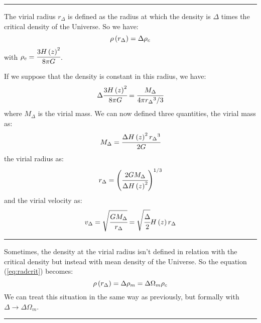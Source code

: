 \noindent\rule{\linewidth}{1pt}
The virial radius $r_\Delta$ is defined as the radius at which the density is $\Delta$ times the critical density of the Universe.
So we have:
\begin{equation}\label{eq:radcrit}
	\rho\left({r_\Delta}\right)=\Delta\rho_c
\end{equation}
with $\rho_c=\cfrac{3H\left({z}\right)^2}{8\pi{G}}$.

If we suppose that the density is constant in this radius, we have:
\begin{equation}
	\Delta\cfrac{3H\left({z}\right)^2}{8\pi{G}}=\cfrac{M_\Delta}{4\pi{r_\Delta}^3/3}
\end{equation}
where $M_\Delta$ is the virial mass.
We can now defined three quantities, the virial mass as:
\begin{equation}
	M_\Delta=\cfrac{\Delta{H\left({z}\right)^2{r_\Delta}^3}}{2G}
\end{equation}
the virial radius as:
\begin{equation}
	r_\Delta=\left(\cfrac{2 G M_\Delta}{\Delta{H\left({z}\right)^2}}\right)^{1/3}
\end{equation}
and the virial velocity as:
\begin{equation}
	v_\Delta=\sqrt{\cfrac{G M_\Delta}{r_\Delta}}=\sqrt{\cfrac{\Delta}{2}} H\left({z}\right){r_\Delta}
\end{equation}

\noindent\rule{\linewidth}{1pt}
Sometimes, the density at the virial radius isn't defined in relation with the critical density but instead with mean density of
the Universe. So the equation (\ref{eq:radcrit}) becomes:
\begin{equation}
	\rho\left({r_\Delta}\right)=\Delta\rho_m=\Delta{\Omega_m}\rho_c
\end{equation}
We can treat this situation in the same way as previously, but formally with $\Delta\rightarrow\Delta\Omega_m$.

\noindent\rule{\linewidth}{1pt}
%
